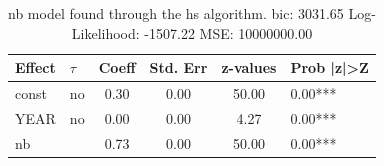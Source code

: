 \begin{table}
	\caption{nb model found through the hs algorithm. bic: 3031.65 Log-Likelihood: -1507.22 MSE: 10000000.00}
	\begin{center}
		\begin{tabular}{|l|l|c|c|c|l|}
			\hline
			Effect & $\tau$ & Coeff & Std. Err & z-values & Prob |z|>Z \\
			\hline
			const & no & 0.30 & 0.00 & 50.00 & 0.00*** \\
			\hline
			YEAR & no & 0.00 & 0.00 & 4.27 & 0.00*** \\
			\hline
			nb &  & 0.73 & 0.00 & 50.00 & 0.00*** \\
			\hline
		\end{tabular}
	\end{center}
\end{table}